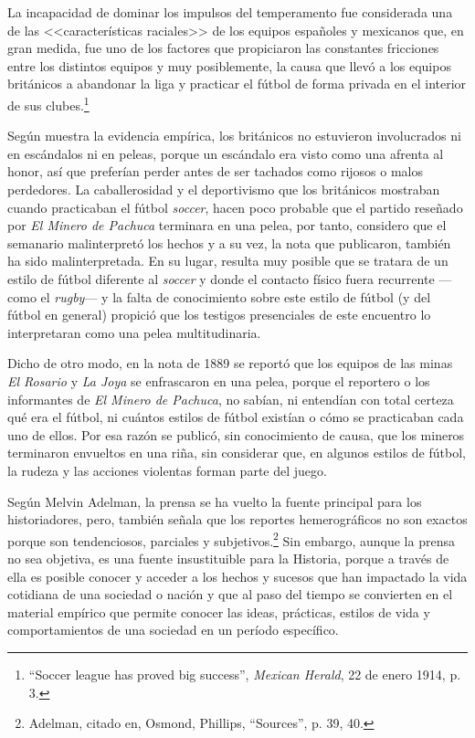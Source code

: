 \documentclass[11pt,a5paper,twoside]{book} %
\begin{document}
La incapacidad de dominar los impulsos del temperamento fue considerada una de las <<características raciales>> de los equipos españoles y mexicanos que, en gran medida, fue uno de los factores que propiciaron las constantes fricciones entre los distintos equipos y muy posiblemente, la causa que llevó a los equipos británicos a abandonar la liga y practicar el fútbol de forma privada en el interior de sus clubes.\footnote{``Soccer league has proved big success'', \emph{Mexican Herald}, 22 de enero 1914, p. 3.}

Según muestra la evidencia empírica, los británicos no estuvieron involucrados ni en escándalos ni en peleas, porque un escándalo era visto como una afrenta al honor, así que preferían perder antes de ser tachados como rijosos o malos perdedores. La caballerosidad y el deportivismo que los británicos mostraban cuando practicaban el fútbol \emph{soccer}, hacen poco probable que el partido reseñado por \emph{El Minero de Pachuca} terminara en una pelea, por tanto, considero que el semanario malinterpretó los hechos y a su vez, la nota que publicaron, también ha sido malinterpretada. En su lugar, resulta muy posible que se tratara de un estilo de fútbol diferente al \emph{soccer} y donde el contacto físico fuera recurrente ---como el \emph{rugby}--- y la falta de conocimiento sobre este estilo de fútbol (y del fútbol en general) propició que los testigos presenciales de este encuentro lo interpretaran como una pelea multitudinaria.

Dicho de otro modo, en la nota de 1889 se reportó que los equipos de las minas \emph{El Rosario} y \emph{La Joya} se enfrascaron en una pelea, porque el reportero o los informantes de \emph{El Minero de Pachuca}, no sabían, ni entendían con total certeza qué era el fútbol, ni cuántos estilos de fútbol existían o cómo se practicaban cada uno de ellos. Por esa razón se publicó, sin conocimiento de causa, que los mineros terminaron envueltos en una riña, sin considerar que, en algunos estilos de fútbol, la rudeza y las acciones violentas forman parte del juego.

Según Melvin Adelman, la prensa se ha vuelto la fuente principal para los historiadores, pero, también señala que los reportes hemerográficos no son exactos porque son tendenciosos, parciales y subjetivos.\footnote{Adelman, citado en, Osmond, Phillips, ``Sources'', p. 39, 40.} Sin embargo, aunque la prensa no sea objetiva, es una fuente insustituible para la Historia, porque a través de ella es posible conocer y acceder a los hechos y sucesos que han impactado la vida cotidiana de una sociedad o nación y que al paso del tiempo se convierten en el material empírico que permite conocer las ideas, prácticas, estilos de vida y comportamientos de una sociedad en un período específico.
\end{document}
